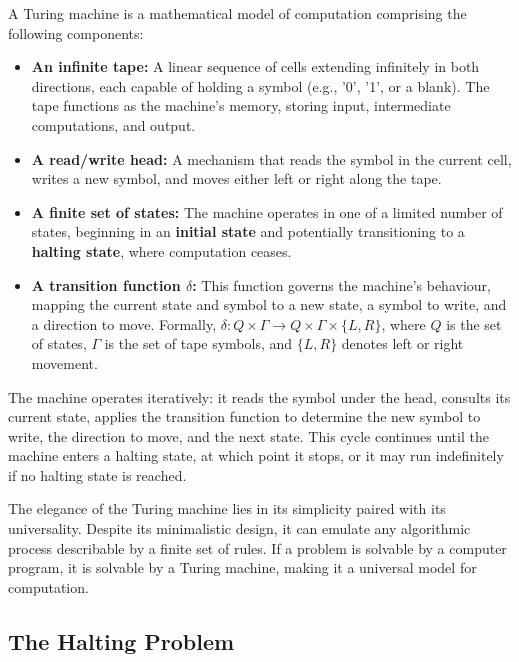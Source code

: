 \begin{definition}
A Turing machine is a mathematical model of computation comprising the following components:
\begin{itemize}
    \item \textbf{An infinite tape:} A linear sequence of cells extending infinitely in both directions, each capable of holding a symbol (e.g., '0', '1', or a blank). The tape functions as the machine's memory, storing input, intermediate computations, and output.
    \item \textbf{A read/write head:} A mechanism that reads the symbol in the current cell, writes a new symbol, and moves either left or right along the tape.
    \item \textbf{A finite set of states:} The machine operates in one of a limited number of states, beginning in an \textbf{initial state} and potentially transitioning to a \textbf{halting state}, where computation ceases.
    \item \textbf{A transition function $\delta$:} This function governs the machine's behaviour, mapping the current state and symbol to a new state, a symbol to write, and a direction to move. Formally, $\delta : Q \times \Gamma \to Q \times \Gamma \times \{L, R\}$, where $Q$ is the set of states, $\Gamma$ is the set of tape symbols, and $\{L, R\}$ denotes left or right movement.
\end{itemize}

The machine operates iteratively: it reads the symbol under the head, consults its current state, applies the transition function to determine the new symbol to write, the direction to move, and the next state. This cycle continues until the machine enters a halting state, at which point it stops, or it may run indefinitely if no halting state is reached.
\end{definition}

The elegance of the Turing machine lies in its simplicity paired with its universality. Despite its minimalistic design, it can emulate any algorithmic process describable by a finite set of rules. If a problem is solvable by a computer program, it is solvable by a Turing machine, making it a universal model for computation.


\subsection{The Halting Problem}


